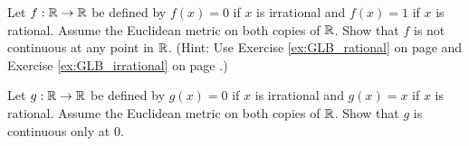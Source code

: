 \item Let $f: \mathbb{R} \to \mathbb{R}$ be defined by $f(x) = 0$ if $x$ is irrational and $f(x) = 1$ if $x$ is rational. Assume the Euclidean metric on both copies of $\mathbb{R}$. Show that $f$ is not continuous at any point in $\mathbb{R}$. (Hint: Use Exercise \ref{ex:GLB_rational} on page \pageref{ex:GLB_rational} and Exercise \ref{ex:GLB_irrational} on page \pageref{ex:GLB_irrational}.)


\begin{comment}

\ExerciseSolution Let $a \in \R$. We first show that $f$ is not continuous at $a$ if $a$ is rational. Let $\epsilon$ be a positive real number less than $1$. Let $\delta$ be a positive real number. By Exercise \ref{ex:GLB_irrational} on page \pageref{ex:GLB_irrational}, we can always find an irrational number between any two real numbers. So there is an irrational number $z$ in the interval $(a - \delta, a + \delta)$. So even though $|z - a| < \delta$, we have $|f(z)-f(a)| = |f(a)| > \epsilon$. This implies that $f$ is not continuous at $a$. 

Now assume that $a$ is an irrational number. Let $\epsilon$ be a positive real number less than $1$. Let $\delta$ be a positive real number. By Exercise \ref{ex:GLB_rational} on page \pageref{ex:GLB_rational}, we can always find a rational number between any two real numbers. So there is a rational number $r$ in the interval $(a - \delta, a + \delta)$. So even though $|r - a| < \delta$, we have $|f(r)-f(a)| = |f(r)| > \epsilon$. This implies that $f$ is not continuous at $a$. So $f$ is not continuous at any real number.

\end{comment}


\item Let $g: \mathbb{R} \to \mathbb{R}$ be defined by $g(x) = 0$ if $x$ is irrational and $g(x) = x$ if $x$ is rational. Assume the Euclidean metric on both copies of $\mathbb{R}$. Show that $g$ is continuous only at $0$. 

